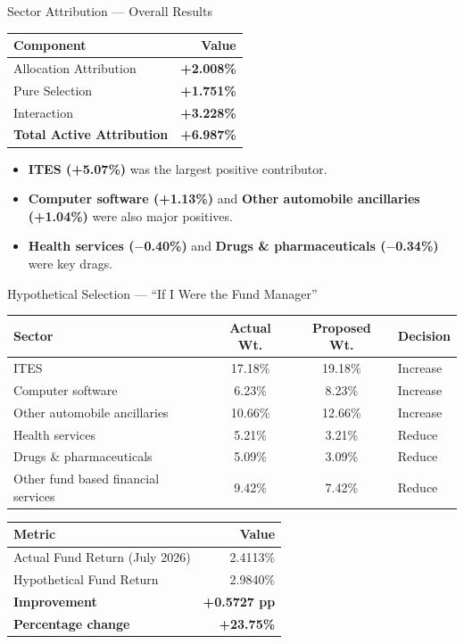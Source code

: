 \documentclass[11pt, aspectratio=43]{beamer}
\begin{document}
\begin{frame}{Sector Attribution --- Overall Results}
\centering
\small
\begin{tabular}{l r}
\toprule
\textbf{Component} & \textbf{Value} \\
\midrule
Allocation Attribution & \textbf{+2.008\%} \\
Pure Selection & \textbf{+1.751\%} \\
Interaction & \textbf{+3.228\%} \\
\textbf{Total Active Attribution} & \textbf{+6.987\%} \\
\bottomrule
\end{tabular}

\vspace{1em}
\begin{itemize}
    \small
    \item \textbf{ITES (+5.07\%)} was the largest positive contributor.
    \item \textbf{Computer software (+1.13\%)} and \textbf{Other automobile ancillaries (+1.04\%)} were also major positives.
    \item \textbf{Health services ($-$0.40\%)} and \textbf{Drugs \& pharmaceuticals ($-$0.34\%)} were key drags.
\end{itemize}
\end{frame}

\begin{frame}{Hypothetical Selection --- ``If I Were the Fund Manager''}
\centering
\footnotesize
\begin{tabular}{l c c l}
\toprule
\textbf{Sector} & \textbf{Actual Wt.} & \textbf{Proposed Wt.} & \textbf{Decision} \\
\midrule
ITES & 17.18\% & 19.18\% & Increase \\
Computer software & 6.23\% & 8.23\% & Increase \\
Other automobile ancillaries & 10.66\% & 12.66\% & Increase \\
Health services & 5.21\% & 3.21\% & Reduce \\
Drugs \& pharmaceuticals & 5.09\% & 3.09\% & Reduce \\
Other fund based financial services & 9.42\% & 7.42\% & Reduce \\
\bottomrule
\end{tabular}

\vspace{0.7em}
\begin{tabular}{l r}
\toprule
\textbf{Metric} & \textbf{Value} \\
\midrule
Actual Fund Return (July 2026) & 2.4113\% \\
Hypothetical Fund Return & 2.9840\% \\
\textbf{Improvement} & \textbf{+0.5727 pp} \\
\textbf{Percentage change} & \textbf{+23.75\%} \\
\bottomrule
\end{tabular}

\vspace{0.5em}
\footnotesize
\end{frame}
\end{document}
